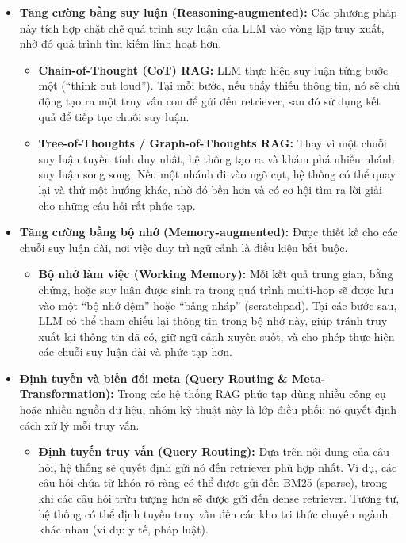 \begin{itemize}
	\item \textbf{Tăng cường bằng suy luận (Reasoning-augmented):}
	Các phương pháp này tích hợp chặt chẽ quá trình suy luận của LLM vào vòng lặp truy xuất, nhờ đó quá trình tìm kiếm linh hoạt hơn.
	\begin{itemize}
		\item \textbf{Chain-of-Thought (CoT) RAG:} 
		LLM thực hiện suy luận từng bước một (“think out loud”). Tại mỗi bước, nếu thấy thiếu thông tin, nó sẽ chủ động tạo ra một truy vấn con để gửi đến retriever, sau đó sử dụng kết quả để tiếp tục chuỗi suy luận.
		\item \textbf{Tree-of-Thoughts / Graph-of-Thoughts RAG:} 
		Thay vì một chuỗi suy luận tuyến tính duy nhất, hệ thống tạo ra và khám phá nhiều nhánh suy luận song song. Nếu một nhánh đi vào ngõ cụt, hệ thống có thể quay lại và thử một hướng khác, nhờ đó bền hơn và có cơ hội tìm ra lời giải cho những câu hỏi rất phức tạp.
	\end{itemize}
	
	\item \textbf{Tăng cường bằng bộ nhớ (Memory-augmented):}
	Được thiết kế cho các chuỗi suy luận dài, nơi việc duy trì ngữ cảnh là điều kiện bắt buộc.
	\begin{itemize}
		\item \textbf{Bộ nhớ làm việc (Working Memory):}
		Mỗi kết quả trung gian, bằng chứng, hoặc suy luận được sinh ra trong quá trình multi-hop sẽ được lưu vào một “bộ nhớ đệm” hoặc “bảng nháp” (scratchpad). Tại các bước sau, LLM có thể tham chiếu lại thông tin trong bộ nhớ này, giúp tránh truy xuất lại thông tin đã có, giữ ngữ cảnh xuyên suốt, và cho phép thực hiện các chuỗi suy luận dài và phức tạp hơn.
	\end{itemize}
	
	\item \textbf{Định tuyến và biến đổi meta (Query Routing \& Meta-Transformation):}
	Trong các hệ thống RAG phức tạp dùng nhiều công cụ hoặc nhiều nguồn dữ liệu, nhóm kỹ thuật này là lớp điều phối: nó quyết định cách xử lý mỗi truy vấn.
	\begin{itemize}
		\item \textbf{Định tuyến truy vấn (Query Routing):}
		Dựa trên nội dung của câu hỏi, hệ thống sẽ quyết định gửi nó đến retriever phù hợp nhất. Ví dụ, các câu hỏi chứa từ khóa rõ ràng có thể được gửi đến BM25 (sparse), trong khi các câu hỏi trừu tượng hơn sẽ được gửi đến dense retriever. Tương tự, hệ thống có thể định tuyến truy vấn đến các kho tri thức chuyên ngành khác nhau (ví dụ: y tế, pháp luật).
		

\end{itemize}
\end{itemize}
